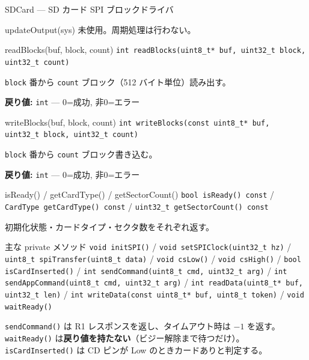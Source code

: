\documentclass[a4paper,11pt,dvipdfmx]{jsarticle}
\begin{document}
\begin{apibox}{SDCard --- SD カード SPI ブロックドライバ}
\begin{funcblock}{updateOutput(sys)}
\vspace{1.5mm}
未使用。周期処理は行わない。
\end{funcblock}

\begin{funcblock}{readBlocks(buf, block, count)}
\texttt{int readBlocks(uint8\_t* buf, uint32\_t block, uint32\_t count)}

\vspace{1.5mm}
\texttt{block} 番から \texttt{count} ブロック（512 バイト単位）読み出す。

\vspace{1.5mm}
\textbf{戻り値:} \texttt{int} --- 0=成功, 非0=エラー
\end{funcblock}

\begin{funcblock}{writeBlocks(buf, block, count)}
\texttt{int writeBlocks(const uint8\_t* buf, uint32\_t block, uint32\_t count)}

\vspace{1.5mm}
\texttt{block} 番から \texttt{count} ブロック書き込む。

\vspace{1.5mm}
\textbf{戻り値:} \texttt{int} --- 0=成功, 非0=エラー
\end{funcblock}

\begin{funcblock}{isReady() / getCardType() / getSectorCount()}
\texttt{bool isReady() const} / \texttt{CardType getCardType() const} /
\texttt{uint32\_t getSectorCount() const}

\vspace{1.5mm}
初期化状態・カードタイプ・セクタ数をそれぞれ返す。
\end{funcblock}

\begin{funcblock}{主な private メソッド}
\texttt{void initSPI()} / \texttt{void setSPIClock(uint32\_t hz)} /
\texttt{uint8\_t spiTransfer(uint8\_t data)} /
\texttt{void csLow()} / \texttt{void csHigh()} /
\texttt{bool isCardInserted()} /
\texttt{int sendCommand(uint8\_t cmd, uint32\_t arg)} /
\texttt{int sendAppCommand(uint8\_t cmd, uint32\_t arg)} /
\texttt{int readData(uint8\_t* buf, uint32\_t len)} /
\texttt{int writeData(const uint8\_t* buf, uint8\_t token)} /
\texttt{void waitReady()}

\vspace{1.5mm}
\texttt{sendCommand()} は R1 レスポンスを返し、タイムアウト時は $-1$ を返す。
\texttt{waitReady()} は\textbf{戻り値を持たない}（ビジー解除まで待つだけ）。
\texttt{isCardInserted()} は CD ピンが Low のときカードありと判定する。
\end{funcblock}


\end{apibox}
\end{document}
